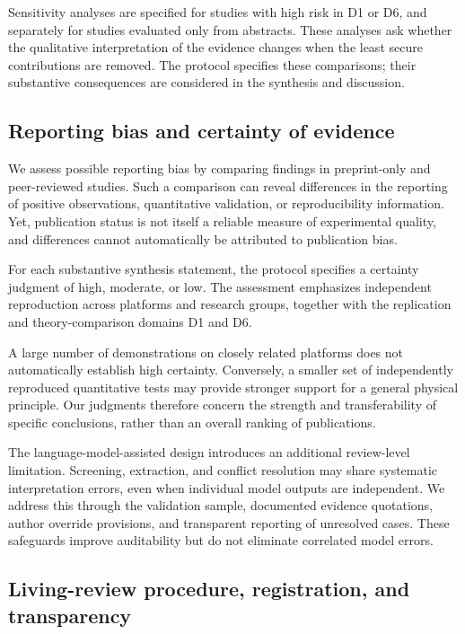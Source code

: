 Sensitivity analyses are specified for studies
with high risk in D1 or D6, and separately for
studies evaluated only from abstracts. These
analyses ask whether the qualitative interpretation
of the evidence changes when the least secure
contributions are removed. The protocol specifies
these comparisons; their substantive consequences
are considered in the synthesis and discussion.

\subsection{Reporting bias and certainty of evidence}
\label{sec:methods-certainty}

We assess possible reporting bias by comparing
findings in preprint-only and peer-reviewed
studies. Such a comparison can reveal differences
in the reporting of positive observations,
quantitative validation, or reproducibility
information. Yet, publication status is not
itself a reliable measure of experimental quality,
and differences cannot automatically be
attributed to publication bias.

For each substantive synthesis statement, the
protocol specifies a certainty judgment of
high, moderate, or low. The assessment emphasizes
independent reproduction across platforms and
research groups, together with the replication
and theory-comparison domains D1 and D6.

A large number of demonstrations on closely
related platforms does not automatically
establish high certainty. Conversely, a smaller
set of independently reproduced quantitative
tests may provide stronger support for a general
physical principle. Our judgments therefore
concern the strength and transferability of
specific conclusions, rather than an overall
ranking of publications.

The language-model-assisted design introduces
an additional review-level limitation.
Screening, extraction, and conflict resolution
may share systematic interpretation errors,
even when individual model outputs are independent.
We address this through the validation sample,
documented evidence quotations, author
override provisions, and transparent reporting
of unresolved cases. These safeguards improve
auditability but do not eliminate correlated
model errors.

\subsection{Living-review procedure, registration, and transparency}
\label{sec:methods-living}

